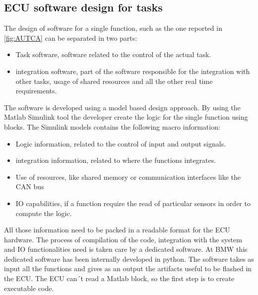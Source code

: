 \documentclass[../main.tex]{subfiles}
\begin{document}
\subsection{ECU software design for tasks}
The design of software for a single function, such as the one reported in \ref{fig:AUTCA} can be separated in two parts:
\begin{itemize}
    \item Task software, software related to the control of the actual task. 
    \item integration software, part of the software responsible for the integration with other tasks, usage of shared resources and all the other real time requirements. 
\end{itemize}
The software is developed using a model based design approach. By using the Matlab Simulink tool the developer create the logic for the single function using blocks. The Simulink models contains the following macro information:
\begin{itemize}
    \item Logic information, related to the control of input and output signals.
    \item integration information, related to where the functions integrates. 
    \item Use of resources, like shared memory or communication interfaces like the CAN bus
    \item IO capabilities, if a function require the read of particular sensors in order to compute the logic. 
\end{itemize}
All those information need to be packed in a readable format for the ECU hardware. The process of compilation of the code, integration with the system and IO functionalities need is taken care by a dedicated software. 
At BMW this dedicated software has been internally developed in python. The software takes as input all the functions and gives as an output the artifacts useful to be flashed in the ECU. 
The ECU can´t read a Matlab block, so the first step is to create executable code. 
\end{document}
